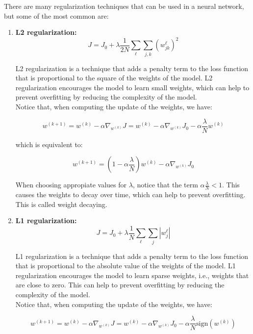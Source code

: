 There are many regularization techniques that can be used in a neural network,
but some of the most common are:

\begin{enumerate}
    \item \textbf{L2 regularization:}
    \begin{equation}
        J = J_0 + \lambda \frac{1}{2 N} \sum_{\ell} \sum_{j, k} (w^\ell_{jk})^2
    \end{equation}

    L2 regularization is a technique that adds a penalty term to the loss function
    that is proportional to the square of the weights of the model. L2 regularization
    encourages the model to learn small weights, which can help to prevent overfitting
    by reducing the complexity of the model.\\

    Notice that, when computing the update of the weights, we have:

    $$w^{(k + 1)} = w^{(k)} - \alpha \nabla_{w^{(k)}} J = w^{(k)} - \alpha \nabla_{w^{(k)}} J_0 - \alpha \frac{\lambda}{N} w^{(k)}$$

    which is equivalent to:

    $$w^{(k + 1)} = (1 - \alpha \frac{\lambda}{N}) w^{(k)} - \alpha \nabla_{w^{(k)}} J_0$$

    When choosing appropiate values for $\lambda$, notice that the term $\alpha \frac{\lambda}{N} < 1$.
    This causes the weights to decay over time, which can help to prevent overfitting. This is 
    called weight decaying.\\

    \item \textbf{L1 regularization:}
    \begin{equation}
        J = J_0 + \lambda \frac{1}{N} \sum_{\ell} \sum_{j} |w^\ell_j|
    \end{equation}

    L1 regularization is a technique that adds a penalty term to the loss function
    that is proportional to the absolute value of the weights of the model. L1
    regularization encourages the model to learn sparse weights, i.e., weights
    that are close to zero. This can help to prevent overfitting by reducing the
    complexity of the model.\\

    Notice that, when computing the update of the weights, we have:

    $$w^{(k + 1)} = w^{(k)} - \alpha \nabla_{w^{(k)}} J = w^{(k)} - \alpha \nabla_{w^{(k)}} J_0 - \alpha \frac{\lambda}{N} \text{sign}(w^{(k)})$$


\end{enumerate}

